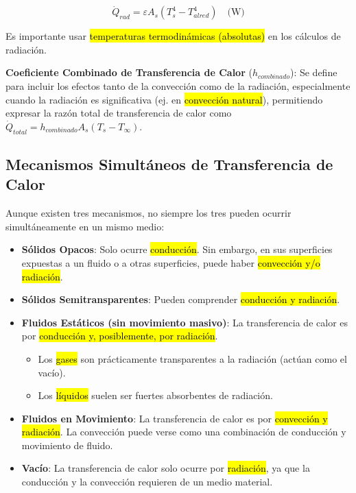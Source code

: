 \documentclass{article}
\begin{document}
    \begin{equation}
    \dot{Q}_{rad} = \varepsilon A_s (T_s^4 - T_{alred}^4) \quad \text{(W)}
    \end{equation}

    Es importante usar \hl{temperaturas termodinámicas (absolutas)} en los cálculos de radiación.

    \textbf{Coeficiente Combinado de Transferencia de Calor} ($h_{combinado}$): Se define para incluir los efectos tanto de la convección como de la radiación, especialmente cuando la radiación es significativa (ej. en \hl{convección natural}), permitiendo expresar la razón total de transferencia de calor como $\dot{Q}_{total} = h_{combinado} A_s (T_s - T_\infty)$.

    \subsection{Mecanismos Simultáneos de Transferencia de Calor}

    Aunque existen tres mecanismos, no siempre los tres pueden ocurrir simultáneamente en un mismo medio:

    \begin{itemize}
        \item \textbf{Sólidos Opacos}: Solo ocurre \hl{conducción}. Sin embargo, en sus superficies expuestas a un fluido o a otras superficies, puede haber \hl{convección y/o radiación}.
        
        \item \textbf{Sólidos Semitransparentes}: Pueden comprender \hl{conducción y radiación}.
        
        \item \textbf{Fluidos Estáticos (sin movimiento masivo)}: La transferencia de calor es por \hl{conducción y, posiblemente, por radiación}.
        \begin{itemize}
            \item Los \hl{gases} son prácticamente transparentes a la radiación (actúan como el vacío).
            \item Los \hl{líquidos} suelen ser fuertes absorbentes de radiación.
        \end{itemize}
        
        \item \textbf{Fluidos en Movimiento}: La transferencia de calor es por \hl{convección y radiación}. La convección puede verse como una combinación de conducción y movimiento de fluido.
        
        \item \textbf{Vacío}: La transferencia de calor solo ocurre por \hl{radiación}, ya que la conducción y la convección requieren de un medio material.
    \end{itemize}
\end{document}
